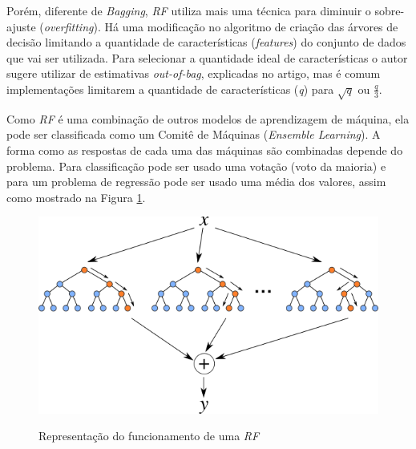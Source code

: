 Porém, diferente de \textit{Bagging}, \textit{\acrshort{RF}} utiliza mais uma técnica para diminuir o sobre-ajuste (\textit{overfitting}). Há uma modificação no algoritmo de criação das árvores de decisão limitando a quantidade de características (\textit{features}) do conjunto de dados que vai ser utilizada. Para selecionar a quantidade ideal de características o autor sugere utilizar de estimativas \textit{out-of-bag}, explicadas no artigo, mas é comum implementações limitarem a quantidade de características (\textit{q}) para $ \sqrt{q} $ ou $ \frac{q}{3} $.

Como \textit{\acrshort{RF}} é uma combinação de outros modelos de aprendizagem de máquina, ela pode ser classificada como um Comitê de Máquinas (\textit{Ensemble Learning}). A forma como as respostas de cada uma das máquinas são combinadas depende do problema. Para classificação pode ser usado uma votação (voto da maioria) e para um problema de regressão pode ser usado uma média dos valores, assim como mostrado na Figura \ref{figure:random_forest}.

\begin{figure}[h]
    \centering
    \includegraphics[scale=0.8]{monography/img/random_forest.png}
    \label{figure:random_forest}
    \caption[Representação do funcionamento de uma \textit{\acrshort{RF}}]{Representação do funcionamento de uma \textit{\acrshort{RF}}\footnotemark}
\end{figure}



